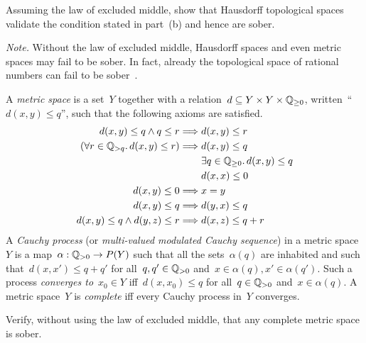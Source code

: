 \documentclass{ws-rv9x6}
\begin{document}
{\begin{exercise}
\begin{alphlist}[(c)]
\item Assuming the law of excluded middle, show that Hausdorff topological
spaces validate the condition stated in part~(b) and hence are sober.
\end{alphlist}
{\scriptsize\emph{Note.} Without the law of excluded middle, Hausdorff spaces
and even metric spaces may fail to be sober. In fact, already the topological
space of rational numbers can fail to be
sober~\cite[Example~8.14(iv)]{fourman-scott:sheaves-and-logic}.\par}
\end{exercise}

\begin{exercise}%
A \emph{metric space} is a set~$Y$ together with a relation~$d \subseteq Y
\times Y \times \mathbb{Q}_{\geq0}$, written~``$d(x,y) \leq q$'', such that the
following axioms are satisfied.
\begin{align*}
  d(x,y) \leq q \wedge q \leq r &\Longrightarrow d(x,y) \leq r \\
  (\forall r \in \mathbb{Q}_{> q}\mathpunct{.} d(x,y) \leq r) &\Longrightarrow d(x,y) \leq q \\
  &\mathrel{\phantom{\Longrightarrow}} \exists q \in \mathbb{Q}_{\geq0}\mathpunct{.} d(x,y) \leq q \\
  &\mathrel{\phantom{\Longrightarrow}} d(x,x) \leq 0 \\
  d(x,y) \leq 0 &\Longrightarrow x = y \\
  d(x,y) \leq q &\Longrightarrow d(y,x) \leq q \\
  d(x,y) \leq q \wedge d(y,z) \leq r &\Longrightarrow d(x,z) \leq q+r
\end{align*}
A \emph{Cauchy process} (or \emph{multi-valued modulated Cauchy sequence}) in a metric
space~$Y$ is a map~$\alpha : \mathbb{Q}_{>0} \to P(Y)$ such that all the sets~$\alpha(q)$
are inhabited and such that~$d(x,x') \leq q + q'$ for all~$q,q' \in \mathbb{Q}_{>0}$
and~$x \in \alpha(q), x' \in \alpha(q')$. Such a process \emph{converges
to}~$x_0 \in Y$ iff~$d(x,x_0) \leq q$ for all~$q \in \mathbb{Q}_{>0}$
and~$x \in \alpha(q)$. A metric space~$Y$ is \emph{complete} iff every Cauchy
process in~$Y$ converges.

Verify, without using the law of excluded middle, that any complete metric
space is sober. \smallskip

\end{exercise}

}
\end{document}
